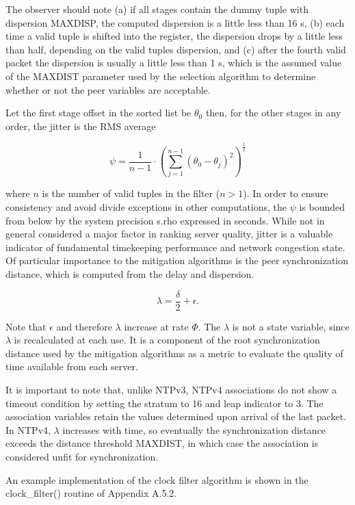 The observer should note (a) if all stages contain the dummy tuple
with dispersion MAXDISP, the computed dispersion is a little less
than 16 s, (b) each time a valid tuple is shifted into the register,
the dispersion drops by a little less than half, depending on the
valid tuples dispersion, and (c) after the fourth valid packet the
dispersion is usually a little less than 1 s, which is the assumed
value of the MAXDIST parameter used by the selection algorithm to
determine whether or not the peer variables are acceptable.

Let the first stage offset in the sorted list be $ \theta_0 $\; then, for
the other stages in any order, the jitter is the RMS average

$$
\psi = \frac{1}{n - 1} \cdot \left( \sum^{n - 1}_{j = 1} (\theta_0 - \theta_j)^2 \right)^{\frac{1}{2}}
$$

where $ n $ is the number of valid tuples in the filter ($ n > 1 $). In
order to ensure consistency and avoid divide exceptions in other
computations, the $ \psi $ is bounded from below by the system precision
s.rho expressed in seconds. While not in general considered a major
factor in ranking server quality, jitter is a valuable indicator of
fundamental timekeeping performance and network congestion state. Of
particular importance to the mitigation algorithms is the peer
synchronization distance, which is computed from the delay and
dispersion.

$$
\lambda = \frac{\delta}{2} + \epsilon.
$$

Note that $ \epsilon $ and therefore $ \lambda $ increase at rate $ \Phi $. The
$ \lambda $ is not a state variable, since $ \lambda $ is recalculated at each
use. It is a component of the root synchronization distance used by
the mitigation algorithms as a metric to evaluate the quality of time
available from each server.

It is important to note that, unlike NTPv3, NTPv4 associations do not
show a timeout condition by setting the stratum to 16 and leap
indicator to 3. The association variables retain the values
determined upon arrival of the last packet. In NTPv4, $ \lambda $
increases with time, so eventually the synchronization distance
exceeds the distance threshold MAXDIST, in which case the association
is considered unfit for synchronization.

An example implementation of the clock filter algorithm is shown in
the clock\_filter() routine of Appendix A.5.2.
